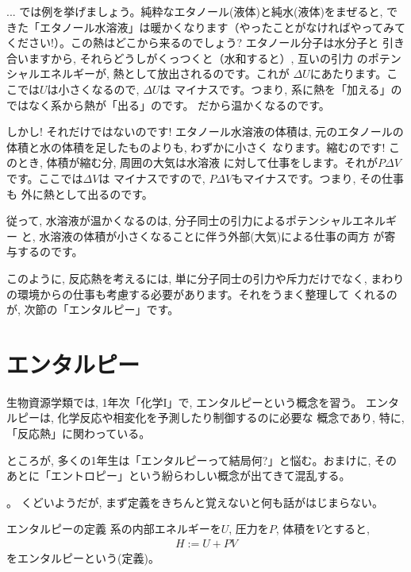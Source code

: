 \begin{faq}{\small{}
 ... では例を挙げましょう。純粋なエタノール(液体)と純水(液体)をまぜると, 
できた「エタノール水溶液」は暖かくなります（やったことがなければやってみて
ください!）。この熱はどこから来るのでしょう? エタノール分子は水分子と
引き合いますから, それらどうしがくっつくと（水和すると）, 互いの引力
のポテンシャルエネルギーが, 熱として放出されるのです。これが
$\Delta U$にあたります。ここでは$U$は小さくなるので, $\Delta U$は
マイナスです。つまり, 系に熱を「加える」のではなく系から熱が「出る」のです。
だから温かくなるのです。

しかし! それだけではないのです! エタノール水溶液の体積は, 
元のエタノールの体積と水の体積を足したものよりも, わずかに小さく
なります。縮むのです! このとき, 体積が縮む分, 周囲の大気は水溶液
に対して仕事をします。それが$P\Delta V$です。ここでは$\Delta V$は
マイナスですので, $P\Delta V$もマイナスです。つまり, その仕事も
外に熱として出るのです。

従って, 水溶液が温かくなるのは, 分子同士の引力によるポテンシャルエネルギー
と, 水溶液の体積が小さくなることに伴う外部(大気)による仕事の両方
が寄与するのです。

このように, 反応熱を考えるには, 単に分子同士の引力や斥力だけでなく, 
まわりの環境からの仕事も考慮する必要があります。それをうまく整理して
くれるのが, 次節の「エンタルピー」です。}\end{faq}\mv


\section{エンタルピー}

生物資源学類では, 1年次「化学I」で, エンタルピーという概念を習う。
エンタルピーは, 化学反応や相変化を予測したり制御するのに必要な
概念であり, 特に, 「反応熱」に関わっている。

ところが, 多くの1年生は「エンタルピーって結局何?」と悩む。おまけに, 
そのあとに「エントロピー」という紛らわしい概念が出てきて混乱する。

。
くどいようだが, まず定義をきちんと覚えないと何も話がはじまらない。
\begin{itembox}{エンタルピーの定義}
系の内部エネルギーを$U$, 圧力を$P$, 体積を$V$とすると, 
\begin{eqnarray}
H:=U+PV\label{eq:def_enthalpy}
\end{eqnarray}
をエンタルピーという(定義)。
\end{itembox}

